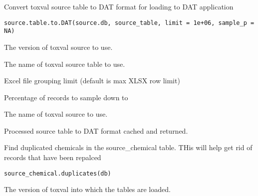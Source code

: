 \documentclass[letterpaper]{book}
\begin{document}
%
\begin{Description}\relax
Convert toxval source table to DAT format for loading to DAT
application
\end{Description}
%
\begin{Usage}
\begin{verbatim}
source.table.to.DAT(source.db, source_table, limit = 1e+06, sample_p = NA)
\end{verbatim}
\end{Usage}
%
\begin{Arguments}
\begin{ldescription}
\item[\code{source.db}] The version of toxval source to use.

\item[\code{source\_table}] The name of toxval source table to use.

\item[\code{limit}] Excel file grouping limit (default is max XLSX row limit)

\item[\code{sample\_p}] Percentage of records to sample down to

\item[\code{source}] The name of toxval source to use.
\end{ldescription}
\end{Arguments}
%
\begin{Value}
Processed source table to DAT format cached and returned.
\end{Value}
%
\begin{Description}\relax
Find duplicated chemicals in the source\_chemical table. THis will help get rid of
records that have been repalced
\end{Description}
%
\begin{Usage}
\begin{verbatim}
source_chemical.duplicates(db)
\end{verbatim}
\end{Usage}
%
\begin{Arguments}
\begin{ldescription}
\item[\code{db}] The version of toxval into which the tables are loaded.
\end{ldescription}
\end{Arguments}
\end{document}
